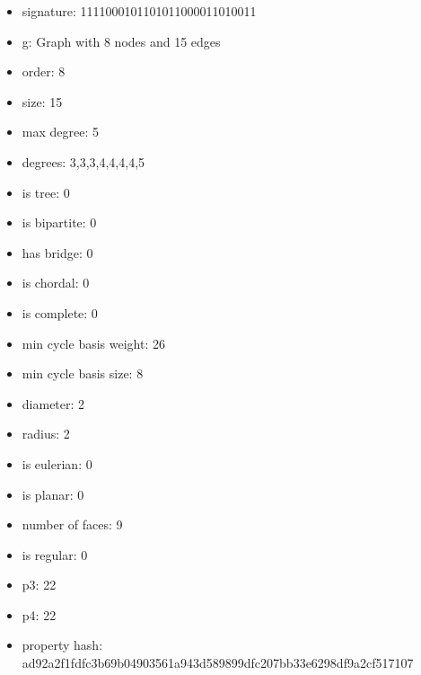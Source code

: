 \begin{itemize}
\item signature: 1111000101101011000011010011
\item g: Graph with 8 nodes and 15 edges
\item order: 8
\item size: 15
\item max degree: 5
\item degrees: 3,3,3,4,4,4,4,5
\item is tree: 0
\item is bipartite: 0
\item has bridge: 0
\item is chordal: 0
\item is complete: 0
\item min cycle basis weight: 26
\item min cycle basis size: 8
\item diameter: 2
\item radius: 2
\item is eulerian: 0
\item is planar: 0
\item number of faces: 9
\item is regular: 0
\item p3: 22
\item p4: 22
\item property hash: ad92a2f1fdfc3b69b04903561a943d589899dfc207bb33e6298df9a2cf517107
\end{itemize}
\newpage
\begin{figure}
\end{figure}
